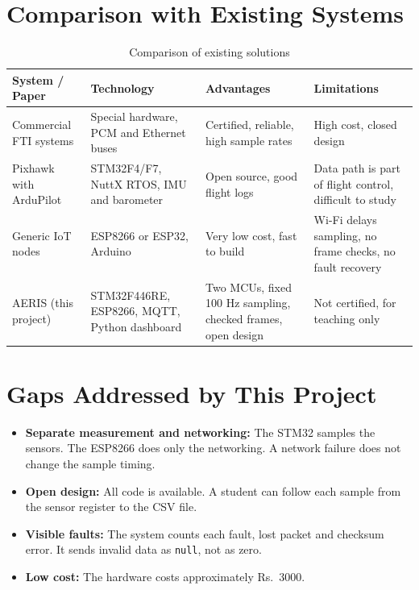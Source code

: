 \documentclass[12pt,a4paper]{report}
\newcommand{\rupee}{Rs.}  %
\begin{document}
\section{Comparison with Existing Systems}
\begin{table}[H]
\centering
\caption{Comparison of existing solutions}
\label{tab:comparison}
\small
\begin{tabularx}{\textwidth}{|>{\hsize=0.9\hsize}X |>{\hsize=1.0\hsize}X |>{\hsize=1.1\hsize}X |>{\hsize=1.0\hsize}X|}
\toprule
\textbf{System / Paper} & \textbf{Technology} & \textbf{Advantages} & \textbf{Limitations}\\
\midrule
Commercial FTI systems & Special hardware, PCM and Ethernet buses & Certified, reliable, high sample rates & High cost, closed design\\
\midrule
Pixhawk with ArduPilot \cite{ardupilot} & STM32F4/F7, NuttX RTOS, IMU and barometer & Open source, good flight logs & Data path is part of flight control, difficult to study\\
\midrule
Generic IoT nodes & ESP8266 or ESP32, Arduino & Very low cost, fast to build & Wi-Fi delays sampling, no frame checks, no fault recovery\\
\midrule
AERIS (this project) & STM32F446RE, ESP8266, MQTT, Python dashboard & Two MCUs, fixed 100 Hz sampling, checked frames, open design & Not certified, for teaching only\\
\bottomrule
\end{tabularx}
\end{table}

\section{Gaps Addressed by This Project}
\begin{itemize}
\item \textbf{Separate measurement and networking:} The STM32 samples the sensors. The ESP8266 does only the networking. A network failure does not change the sample timing.
\item \textbf{Open design:} All code is available. A student can follow each sample from the sensor register to the CSV file.
\item \textbf{Visible faults:} The system counts each fault, lost packet and checksum error. It sends invalid data as \texttt{null}, not as zero.
\item \textbf{Low cost:} The hardware costs approximately \rupee~3000.
\end{itemize}
\end{document}
